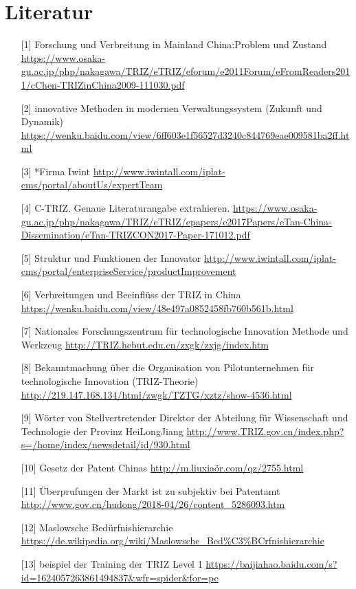 \documentclass[11pt,a4paper]{article}
\begin{document}
\section{Literatur}
\begin{itemize}
\item[{[1]}] Forschung und Verbreitung in Mainland China:Problem und Zustand
\url{https://www.osaka-gu.ac.jp/php/nakagawa/TRIZ/eTRIZ/eforum/e2011Forum/eFromReaders2011/cChen-TRIZinChina2009-111030.pdf}
\item[{[2]}] innovative Methoden in modernen Verwaltungssystem (Zukunft und Dynamik)
\url{https://wenku.baidu.com/view/6ff603e1f56527d3240c844769eae009581ba2ff.html}
\item[{[3]}] *Firma Iwint
\url{http://www.iwintall.com/iplat-cms/portal/aboutUs/expertTeam}
\item[{[4]}] C-TRIZ. Genaue Literaturangabe extrahieren. 
\url{https://www.osaka-gu.ac.jp/php/nakagawa/TRIZ/eTRIZ/epapers/e2017Papers/eTan-China-Dissemination/eTan-TRIZCON2017-Paper-171012.pdf}
\item[{[5]}] Struktur und Funktionen der Innovator
\url{http://www.iwintall.com/iplat-cms/portal/enterpriseService/productImprovement}
\item[{[6]}] Verbreitungen und Beeinflüss der TRIZ in China
  \url{https://wenku.baidu.com/view/48e497a0852458fb760b561b.html}
\item[{[7]}] Nationales Forschungszentrum für technologische Innovation
  Methode und Werkzeug \url{http://TRIZ.hebut.edu.cn/zxgk/zxjg/index.htm}
\item[{[8]}] Bekanntmachung über die Organisation von Pilotunternehmen für
  technologische Innovation (TRIZ-Theorie) 
\url{http://219.147.168.134/html/zwgk/TZTG/xztz/show-4536.html}
\item[{[9]}] Wörter von Stellvertretender Direktor der Abteilung für
  Wissenschaft und Technologie der Provinz HeiLongJiang
  \url{http://www.TRIZ.gov.cn/index.php?s=/home/index/newsdetail/id/930.html}
\item[{[10]}] Gesetz der Patent Chinas
\url{http://m.liuxiaör.com/qz/2755.html}
\item[{[11]}] Überprufungen der Markt ist zu subjektiv bei Patentamt
\url{http://www.gov.cn/hudong/2018-04/26/content_5286093.htm}
\item[{[12]}] Maslowsche Bedürfnishierarchie
\url{https://de.wikipedia.org/wiki/Maslowsche_Bed%C3%BCrfnishierarchie}
\item[{[13]}]  beispiel der Training der TRIZ Level 1
\url{https://baijiahao.baidu.com/s?id=1624057263861494837&wfr=spider&for=pc}

\end{itemize}
\end{document}
